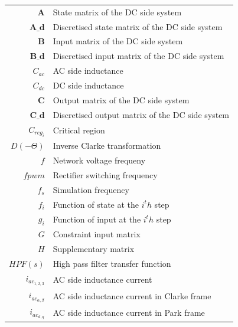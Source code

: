   \begin{scriptsize}
\begin{tabularx}{\textwidth}{r|X}
  $\textbf{A}$                  & State matrix of the DC side system\\
  $\textbf{A_d}$                & Discretised state matrix of the DC side system\\
  $\textbf{B}$                  & Input matrix of the DC side system\\
  $\textbf{B_d}$                & Discretised input matrix of the DC side system\\
  $C_{ac}$                          & AC side inductance\\
  $C_{dc}$                          & DC side inductance\\
  $\textbf{C}$                  & Output matrix of the DC side system\\
  $\textbf{C_d}$                & Discretised output matrix of the DC side system\\
  $C_{reg_i}$                       & Critical region\\
  $D(-\Theta)$                      & Inverse Clarke transformation\\
  $f$                               & Network voltage frequeny\\
  $fpwm$                            & Rectifier switching frequency\\
  $f_s$                             & Simulation frequency\\
  $f_i$                             & Function of state at the $i^th$ step\\
  $g_i$                             & Function of input at the $i^th$ step\\
  $G$                               & Constraint input matrix\\
  $H$                               & Supplementary matrix\\
  $HPF(s)$                          & High pass filter transfer function\\
  $i_{ac_{1,2,3}}$                  & AC side inductance current\\
  $i_{ac_{\alpha,\beta}}$           & AC side inductance current in Clarke frame\\
  $i_{ac_{d,q}}$                    & AC side inductance current in Park frame\\

\end{tabularx}
\end{scriptsize}
